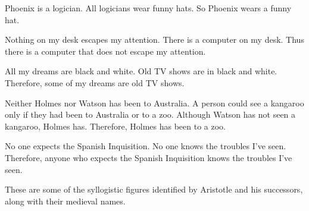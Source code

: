\documentclass[PHIL101-Textbook.tex]{subfiles}
\begin{document}
\begin{earg}
\item Phoenix is a logician. All logicians wear funny hats. So Phoenix wears a funny hat.
\item Nothing on my desk escapes my attention. There is a computer on my desk. Thus there is a computer that does not escape my attention.
\item All my dreams are black and white. Old TV shows are in black and white. Therefore, some of my dreams are old TV shows.
\item Neither Holmes nor Watson has been to Australia. A person could see a kangaroo only if they had been to Australia or to a zoo. Although Watson has not seen a kangaroo, Holmes has. Therefore, Holmes has been to a zoo.
\item No one expects the Spanish Inquisition. No one knows the troubles I've seen. Therefore, anyone who expects the Spanish Inquisition knows the troubles I've seen.
\end{earg}


\noindent\problempart
\label{pr.BarbaraEtc}
These are some of the syllogistic figures identified by Aristotle and his successors, along with their medieval names. 
\end{document}
